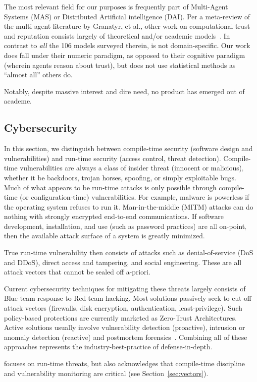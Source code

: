 The most relevant field for our purposes is frequently part of Multi-Agent Systems (MAS) or Distributed Artificial intelligence (DAI).
Per a meta-review of the multi-agent literature by Granatyr, et al., other work on computational trust and reputation consists largely of theoretical and/or academic models~\cite{granatyr2015trust}.
In contrast to \emph{all} the 106 models surveyed therein, \projectName is not domain-specific.
Our work does fall under their numeric paradigm, as opposed to their cognitive paradigm (wherein agents reason about trust), but does not use statistical methods as ``almost all'' others do.

Notably, despite massive interest and dire need, no product has emerged out of academe.


\subsection{Cybersecurity}\label{subsec:cyber}

In this section, we distinguish between compile-time security (software design and vulnerabilities) and run-time security (access control, threat detection).
Compile-time vulnerabilities are always a class of insider threat (innocent or malicious), whether it be backdoors, trojan horses, spoofing, or simply exploitable bugs.
Much of what appears to be run-time attacks is only possible through compile-time (or configuration-time) vulnerabilities.
For example, malware is powerless if the operating system refuses to run it.
Man-in-the-middle (MITM) attacks can do nothing with strongly encrypted end-to-end communications.
If software development, installation, and use (such as password practices) are all on-point, then the available attack surface of a system is greatly minimized.

True run-time vulnerability then consists of attacks such as denial-of-service (DoS and DDoS), direct access and tampering, and social engineering.
These are all attack vectors that cannot be sealed off a-priori.

Current cybersecurity techniques for mitigating these threats largely consists of Blue-team response to Red-team hacking.
Most solutions passively seek to cut off attack vectors (firewalls, disk encryption, authentication, least-privilege).
Such policy-based protections are currently marketed as Zero-Trust Architectures.
Active solutions usually involve vulnerability detection (proactive), intrusion or anomaly detection (reactive) and postmortem forensics~\cite{anderson2020security, brooks2018cybersecurity, wittkop2022cybersecurity}.
Combining all of these approaches represents the industry-best-practice of defense-in-depth.

\projectName focuses on run-time threats, but also acknowledges that compile-time discipline and vulnerability monitoring are critical (see Section~\ref{sec:vectors}).